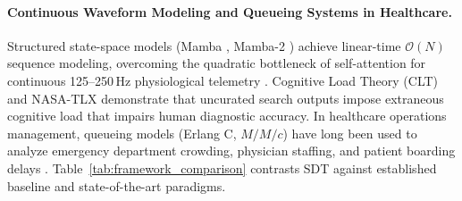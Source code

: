 \documentclass[ijds,dblanonrev]{informs4}
\begin{document}
\paragraph{Continuous Waveform Modeling and Queueing Systems in Healthcare.}
Structured state-space models (Mamba \citep{gu2023mamba}, Mamba-2 \citep{dao2024mamba2}) achieve linear-time $\mathcal{O}(N)$ sequence modeling, overcoming the quadratic bottleneck of self-attention for continuous 125--250\,Hz physiological telemetry \citep{hyland2020hirid}. Cognitive Load Theory (CLT) \citep{sweller1988cognitive} and NASA-TLX \citep{hart1988development} demonstrate that uncurated search outputs impose extraneous cognitive load that impairs human diagnostic accuracy. In healthcare operations management, queueing models (Erlang C, $M/M/c$) have long been used to analyze emergency department crowding, physician staffing, and patient boarding delays \citep{erlang1917solution,armony2015patient}. Table~\ref{tab:framework_comparison} contrasts SDT against established baseline and state-of-the-art paradigms.
\end{document}
